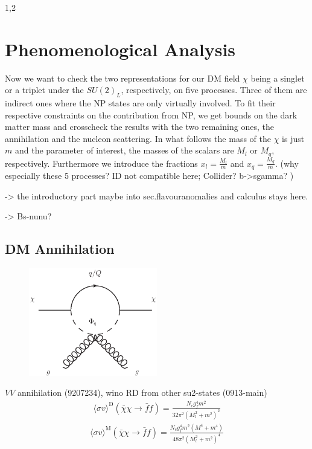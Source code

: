 \documentclass[11pt,a4paper,twoside]{article}
\numberwithin{equation}{section}
\begin{document}
\begin{spacing}{1,2}
\section{Phenomenological Analysis}
Now we want to check the two representations for our DM field $\chi$ being a singlet or a triplet under the $SU(2)_L$, respectively, on five processes. 
Three of them
are indirect ones where the NP states are only virtually involved. To fit their respective constraints on the contribution from NP, we get bounds on 
the dark matter mass and crosscheck the results with the two remaining ones, the annihilation and the nucleon scattering. In what follows the mass
of the $\chi$ is just $m$ and the parameter of interest, the masses of the scalars are $M_l$ or $M_q$, respectively. Furthermore we introduce the fractions
$x_l=\frac{M_l}{m}$ and $x_q = \frac{M_q}{m}$. 
(why especially these 5 processes? ID not compatible here; Collider? b->sgamma? )


-> the introductory part maybe into sec.flavouranomalies and calculus stays here.


-> Bs-nunu? 





\subsection{DM Annihilation}
\begin{figure}[t]
 \includegraphics[width=0.5\textwidth]{../pics/phigluon.eps}
\end{figure}
$VV$ annihilation (9207234), wino RD from other su2-states (0913-main)
\begin{align}
 \langle \sigma v \rangle^\text{D} \left(\bar \chi \chi \rightarrow \bar f f\right) = \frac{N_c g_f^4 m^2}{32\pi^2\left(M_l^2 + m^2\right)^2}
\end{align}
\begin{align}
 \langle \sigma v \rangle^\text{M} \left(\bar \chi \chi \rightarrow \bar f f\right) = \frac{N_c g_f^4 m^2 \left(M^4+m^4 \right)}{48\pi^2\left(M_l^2 + m^2\right)^4}
\end{align}



\end{spacing}
\end{document}
